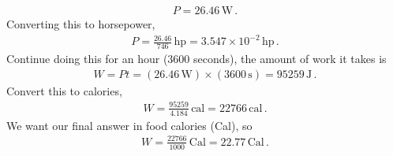 \documentclass[11pt]{article}
\begin{document}
\begin{align*}
P = 26.46\,\text{W}\,.
\end{align*}
Converting this to horsepower, 
\begin{align*}
P = \frac{26.46}{746}\, \text{hp} = 3.547\times 10^{-2}\,\text{hp}\,.
\end{align*}
Continue doing this for an hour ($3600$ seconds), the amount of work it takes is  
\begin{align*}
W = P t = (26.46\,\text{W}) \times (3600 \,\text{s}) = 95259 \,\text{J}\,. 
\end{align*}
Convert this to calories, 
\begin{align*}
W = \frac{95259}{4.184}\,\text{cal} = 22766\,\text{cal}\,.
\end{align*}
We want our final answer in food calories (Cal), so 
\begin{align*}
W = \frac{22766}{1000}\,\text{Cal} = 22.77 \,\text{Cal}\,.
\end{align*}
\end{document}
